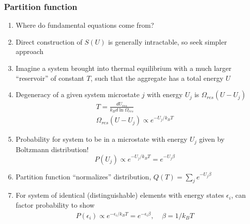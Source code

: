 \documentclass[11pt]{article}
\begin{document}
\subsubsection{Partition function}
\label{sec:org7895187}
\begin{enumerate}
\item Where do fundamental equations come from?
\item Direct construction of \(S(U)\) is generally intractable, so seek simpler approach
\item Imagine a system brought into thermal equilibrium with a much
larger ``reservoir'' of constant \(T\), such that the aggregate has a
total energy \(U\)
\item Degeneracy of a given system microstate \(j\) with energy \(U_j\)
is \(\Omega_{res}(U-U_j)\)
\begin{eqnarray*}
  T = \frac{dU_{res}}{k_Bd\ln\Omega_{res}} \\
  \Omega_{res}(U-U_j) \propto e^{-U_j/k_B T}
\end{eqnarray*}
\item Probability for system to be in a microstate with energy \(U_j\) given by Boltzmann
distribution!
\begin{displaymath}
  P(U_j) \propto e^{-U_j/k_B T} = e^{-U_j \beta}
\end{displaymath}
\item Partition function ``normalizes'' distribution, \(Q(T) = \sum_j
         e^{-U_j \beta}\)
\item For system of identical (distinguishable) elements with energy states \(\epsilon_i\),
can factor probability to show
\begin{eqnarray*}
  P(\epsilon_i) \propto e^{-\epsilon_i/k_B T} = e^{-\epsilon_i \beta},\
  \ \ \ \ \beta=1/k_BT
\end{eqnarray*}
\end{enumerate}
\end{document}
